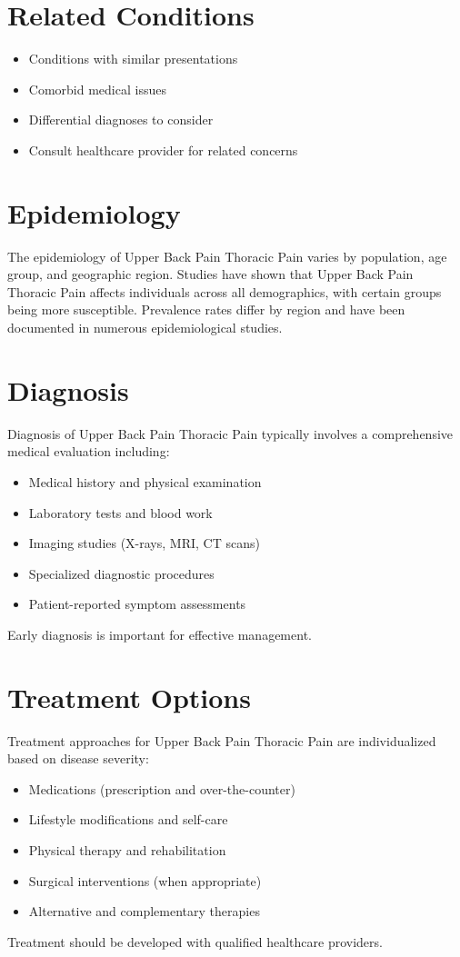 \section*{Related Conditions}
\begin{itemize}
  \item Conditions with similar presentations
  \item Comorbid medical issues
  \item Differential diagnoses to consider
  \item Consult healthcare provider for related concerns
\end{itemize}

\section*{Epidemiology}
The epidemiology of Upper Back Pain Thoracic Pain varies by population, age group, and geographic region. Studies have shown that Upper Back Pain Thoracic Pain affects individuals across all demographics, with certain groups being more susceptible. Prevalence rates differ by region and have been documented in numerous epidemiological studies.

\section*{Diagnosis}
Diagnosis of Upper Back Pain Thoracic Pain typically involves a comprehensive medical evaluation including:
\begin{itemize}
  \item Medical history and physical examination
  \item Laboratory tests and blood work
  \item Imaging studies (X-rays, MRI, CT scans)
  \item Specialized diagnostic procedures
  \item Patient-reported symptom assessments
\end{itemize}
Early diagnosis is important for effective management.

\section*{Treatment Options}
Treatment approaches for Upper Back Pain Thoracic Pain are individualized based on disease severity:
\begin{itemize}
  \item Medications (prescription and over-the-counter)
  \item Lifestyle modifications and self-care
  \item Physical therapy and rehabilitation
  \item Surgical interventions (when appropriate)
  \item Alternative and complementary therapies
\end{itemize}
Treatment should be developed with qualified healthcare providers.

